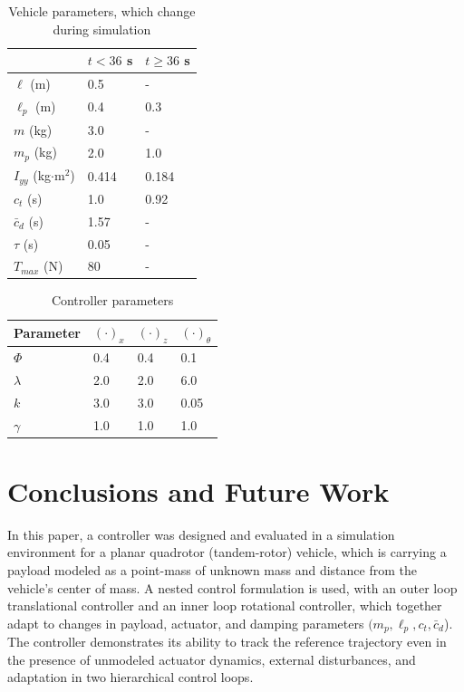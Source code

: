 \documentclass[letterpaper, 10 pt, conference]{ieeeconf}\usepackage[margin=1in]{geometry}
\begin{document}
\begin{table}[h!]
	\renewcommand{\arraystretch}{1.2}
	\centering
    \begin{tabular}{|lll|} \hline
    ~ & $t < 36$ s & $t \geq 36$ s \\ \hline
    $\ell$ (m) & 0.5 & - \\
    $\ell_p$ (m) & 0.4 & 0.3 \\
    $m$ (kg) & 3.0 & - \\
    $m_p$ (kg) & 2.0 & 1.0 \\
    $I_{yy}$ (kg$\cdot$m$^2$) & 0.414 & 0.184 \\ 
    $c_t$ (s) & 1.0 & 0.92 \\
    $\bar{c}_d$ (s) & 1.57 & - \\
    $\tau$ (s) & 0.05 & - \\
    $T_{max}$ (N) & 80 & - \\ \hline
    \end{tabular}
    \caption{Vehicle parameters, which change during simulation}
    \label{plant_params}
\end{table}
\begin{table}[h!]
	\renewcommand{\arraystretch}{1.2}
	\centering
    \begin{tabular}{|llll|} \hline
    Parameter & $(\cdot)_x$ & $(\cdot)_z$ & $(\cdot)_\theta$ \\ \hline
    $\Phi$ & 0.4 & 0.4 & 0.1 \\    
    $\lambda$ & 2.0 & 2.0 & 6.0 \\
    $k$ & 3.0 & 3.0 & 0.05 \\
    $\gamma$ & 1.0 & 1.0 & 1.0 \\ \hline
    \end{tabular}
    \caption{Controller parameters}
    \label{ctrl_params}
\end{table}

\section{Conclusions and Future Work}
In this paper, a controller was designed and evaluated in a simulation environment for a planar quadrotor (tandem-rotor) vehicle, which is carrying a payload modeled as a point-mass of unknown mass and distance from the vehicle's center of mass. A nested control formulation is used, with an outer loop translational controller and an inner loop rotational controller, which together adapt to changes in payload, actuator, and damping parameters $(m_p, \ell_p, c_t, \bar{c}_d$). The controller demonstrates its ability to track the reference trajectory even in the presence of unmodeled actuator dynamics, external disturbances, and adaptation in two hierarchical control loops.
\end{document}
